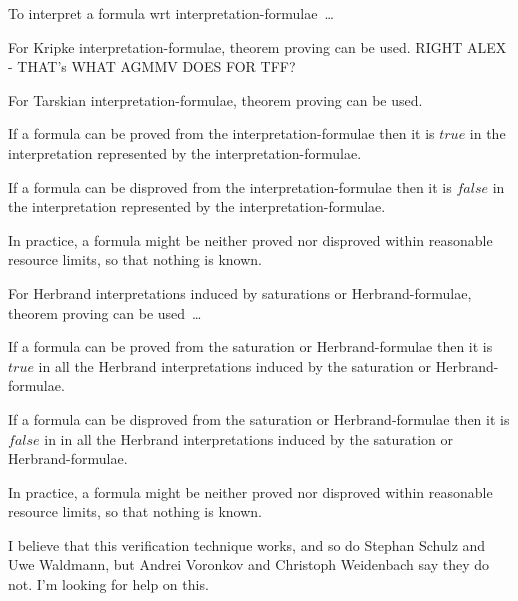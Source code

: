 \documentclass{easychair}
\newenvironment{packed_itemize}{
\vspace*{-0.3em}
\begin{itemize}
\setlength{\partopsep}{0pt}
\setlength{\itemsep}{1pt}
\setlength{\parskip}{0pt}
\setlength{\parsep}{0pt}
}{\end{itemize}}
\begin{document}
To interpret a formula wrt interpretation-formulae~\ldots
\begin{packed_itemize}
\item For Kripke interpretation-formulae, theorem proving can be used.
      RIGHT ALEX - THAT's WHAT AGMMV DOES FOR TFF?
\item For Tarskian interpretation-formulae, theorem proving can be used.
      \begin{packed_itemize}
      \item If a formula can be proved from the interpretation-formulae then it is $true$ in the 
            interpretation represented by the interpretation-formulae.
      \item If a formula can be disproved from the interpretation-formulae then it is $false$ in 
            the interpretation represented by the interpretation-formulae.
      \item In practice, a formula might be neither proved nor disproved within reasonable 
            resource limits, so that nothing is known.
      \end{packed_itemize}
\item For Herbrand interpretations induced by saturations or Herbrand-formulae, theorem proving 
      can be used~\ldots
      \begin{packed_itemize}
      \item If a formula can be proved from the saturation or Herbrand-formulae then it is 
            $true$ in all the Herbrand interpretations induced by the saturation or 
            Herbrand-formulae.
      \item If a formula can be disproved from the saturation or Herbrand-formulae then it is 
            $false$ in in all the Herbrand interpretations induced by the saturation or 
            Herbrand-formulae.
      \item In practice, a formula might be neither proved nor disproved within reasonable 
            resource limits, so that nothing is known.
      \end{packed_itemize}
      I believe that this verification technique works, and so do Stephan Schulz and Uwe Waldmann,
      but Andrei Voronkov and Christoph Weidenbach say they do not.
      I'm looking for help on this.
\end{packed_itemize}

\end{document}

